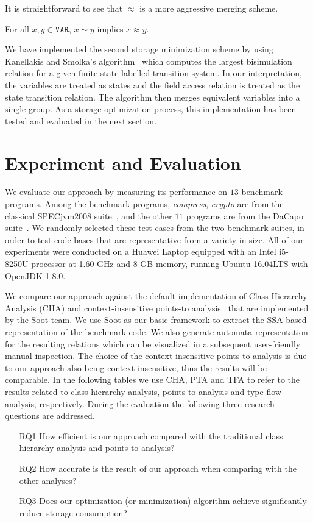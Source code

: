 \documentclass[runningheads]{llncs}
\newcommand\Var{\mathtt{VAR}}
\begin{document}
It is straightforward to see that $\approx$ is a more aggressive merging scheme.
\begin{lemma}\label{lem:bisimilar}
For all $x,y\in\Var$, $x\sim y$ implies $x\approx y$.
\end{lemma}


We have implemented the second storage minimization scheme by using Kanellakis and Smolka's algorithm~\cite{Kanellakis90} which computes the largest bisimulation relation for a given finite state labelled transition system. In our interpretation, the variables are treated as states and the field access relation is treated as the state transition relation. The algorithm then merges equivalent variables into a single group. As a storage optimization process, this implementation has been tested and evaluated in the next section.


\section{Experiment and Evaluation}\label{sec:experiment}

We evaluate our approach by measuring its performance on $13$ benchmark programs. Among the benchmark programs, \textit{compress}, \textit{crypto} are from the classical SPECjvm2008 suite~\cite{specjvm}, and the other $11$ programs are from the DaCapo suite~\cite{Blackburn2006}. We randomly selected these test cases from the two benchmark suites, in order to test code bases that are representative from a variety in size.
All of our experiments were conducted on a Huawei Laptop equipped with an Intel i5-8250U processor at 1.60 GHz and 8 GB memory, running Ubuntu 16.04LTS with OpenJDK 1.8.0.

We compare our approach against the default implementation of Class Hierarchy Analysis (CHA) and context-insensitive points-to analysis~\cite{Lhotak2003} that are implemented by the Soot team. We use Soot as our basic framework to extract the SSA based representation of the benchmark code. We also generate automata representation for the resulting relations which can be visualized in a subsequent user-friendly manual inspection. The choice of the context-insensitive points-to analysis is due to our approach also being context-insensitive, thus the results will be comparable. In the following tables we use CHA, PTA and TFA to refer to the results related to class hierarchy analysis, points-to analysis and type flow analysis, respectively.
%
During the evaluation the following three research questions are addressed.
\begin{enumerate}
  \item[RQ1] How efficient is our approach compared with the traditional class hierarchy analysis and points-to analysis?
  \item[RQ2] How accurate is the result of our approach when comparing with the other analyses?
  \item[RQ3] Does our optimization (or minimization) algorithm achieve significantly reduce storage consumption?
\end{enumerate}
\end{document}

